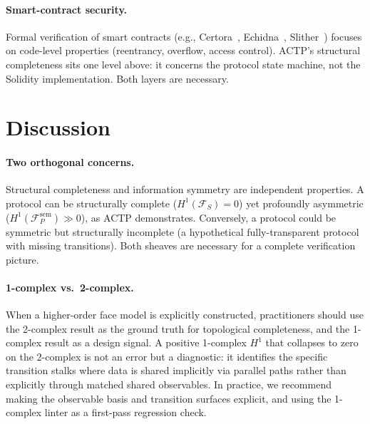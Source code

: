 \documentclass[11pt]{article}
\theoremstyle{plain}
\theoremstyle{definition}
\newcommand{\Fsh}{\mathcal{F}}         %
\newcommand{\Hone}{H^{1}}
\begin{document}
\paragraph{Smart-contract security.}
Formal verification of smart contracts (e.g.,
Certora~\cite{Certora2026}, Echidna~\cite{Echidna2020},
Slither~\cite{Slither2019}) focuses on code-level properties (reentrancy,
overflow, access control).  ACTP's structural completeness sits one level
above: it concerns
the protocol state machine, not the Solidity implementation.  Both layers are
necessary.

\section{Discussion}
\label{sec:discussion}

\paragraph{Two orthogonal concerns.}
Structural completeness and information symmetry are independent properties.
A protocol can be structurally complete ($\Hone(\Fsh_S) = 0$) yet profoundly
asymmetric ($\Hone(\Fsh_P^{\mathrm{sem}}) \gg 0$), as ACTP demonstrates.  Conversely, a
protocol could be symmetric but structurally incomplete (a hypothetical
fully-transparent protocol with missing transitions).  Both sheaves are
necessary for a complete verification picture.

\paragraph{1-complex vs.\ 2-complex.}
When a higher-order face model is explicitly constructed, practitioners should
use the 2-complex result as the ground truth for topological completeness, and
the 1-complex result as a design signal.
A positive 1-complex $\Hone$ that collapses to zero on the 2-complex is
not an error but a diagnostic: it identifies the specific transition stalks
where data is shared implicitly via parallel paths rather than explicitly
through matched shared observables.  In practice, we recommend making the
observable basis and transition surfaces explicit, and using the 1-complex
linter as a first-pass regression check.
\end{document}
